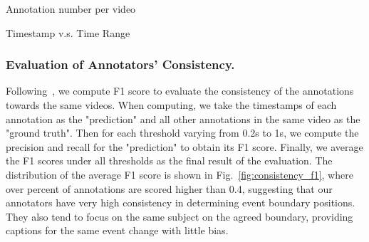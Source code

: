 \documentclass[runningheads]{llncs}
\begin{document}
\noindent
\begin{minipage}{\textwidth}
\begin{center}
\begin{minipage}[t]{0.52\textwidth}
\makeatletter{}
\caption{Annotation number per video}
\setlength{\belowcaptionskip}{0.5cm}
\label{table:annotation_num}
\end{minipage}
\begin{minipage}[t]{0.46\textwidth}
\makeatletter{}
\caption{Timestamp v.s. Time Range}
\setlength{\belowcaptionskip}{0.5cm}
\label{table:timestamp_range}
\end{minipage}
\end{center}
\end{minipage} 
\subsubsection{Evaluation of Annotators' Consistency.}
\label{annotation_details:f1_consistency}
Following~\cite{shou2021generic}, we compute F1 score to evaluate the consistency of the annotations towards the same videos. When computing, we take the timestamps of each annotation as the "prediction" and all other annotations in the same video as the "ground truth". Then for each threshold varying from 0.2s to 1s, we compute the precision and recall for the "prediction" to obtain its F1 score. Finally, we average the F1 scores under all thresholds as the final result of the evaluation. The distribution of the average F1 score is shown in Fig.~\ref{fig:consistency_f1}, where over  percent of annotations are scored higher than 0.4, suggesting that our annotators have very high consistency in determining event boundary positions. They also tend to focus on the same subject on the agreed boundary, providing captions for the same event change with little bias.
\end{document}
